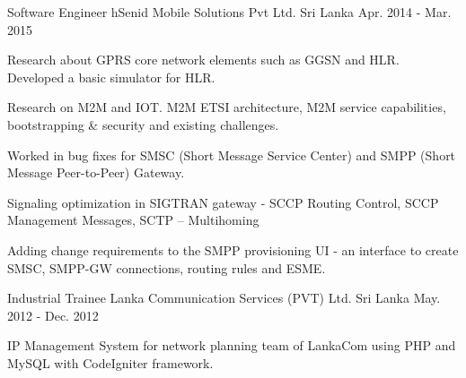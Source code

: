 \begin{cventries}
  \cventry
      {Software Engineer} %
      {hSenid Mobile Solutions Pvt Ltd.} %
      {Sri Lanka} %
      {Apr. 2014 - Mar. 2015} %
      { %
        \begin{cvitems}
          \item {Research about GPRS core network elements such as GGSN and HLR. Developed a basic simulator for HLR.}
          \item {Research on M2M and IOT. M2M ETSI architecture, M2M service capabilities, bootstrapping \& security and existing challenges.}
          \item {Worked in bug fixes for SMSC (Short Message Service Center) and SMPP (Short Message Peer-to-Peer) Gateway.}
          \item {Signaling optimization in SIGTRAN gateway - SCCP Routing Control, SCCP Management Messages, SCTP – Multihoming}
          \item {Adding change requirements to the SMPP provisioning UI - an interface to create SMSC, SMPP-GW connections, routing rules and ESME.}
        \end{cvitems}
      }


  \cventry
      {Industrial Trainee} %
      {Lanka Communication Services (PVT) Ltd.} %
      {Sri Lanka} %
      {May. 2012 - Dec. 2012} %
      { %
        \begin{cvitems}
          \item {IP Management System for network planning team of LankaCom using PHP and MySQL with CodeIgniter framework.}
        \end{cvitems}
      }


\end{cventries}